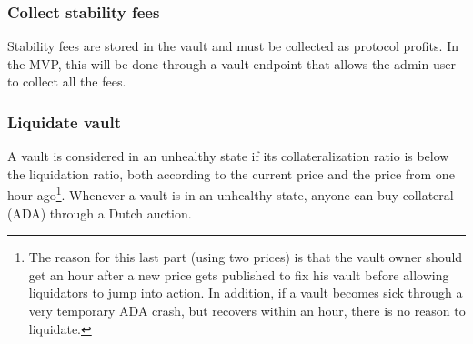 \documentclass{article} %
\begin{document}
\subsubsection*{Collect stability fees}

Stability fees are stored in the vault and must be collected as protocol
profits. In the MVP, this will be done through a vault endpoint that allows the
admin user to collect all the fees. \\


\subsubsection*{Liquidate vault}

A vault is considered in an unhealthy state if its collateralization ratio is
below the liquidation ratio, both according to the current price and the price
from one hour ago\footnote{
  The reason for this last part (using two prices) is that the vault owner
  should get an hour after a new price gets published to fix his vault before
  allowing liquidators to jump into action. In addition, if a vault becomes sick
  through a very temporary ADA crash, but recovers within an hour, there is no
  reason to liquidate.}.
Whenever a vault is in an unhealthy state, anyone can buy collateral (ADA)
through a Dutch auction.
\end{document}
